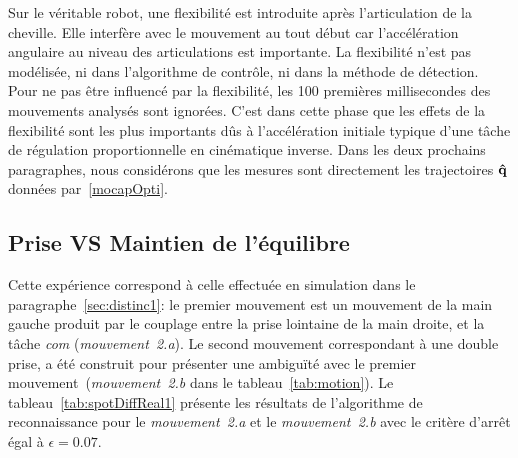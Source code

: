 Sur le véritable robot, une flexibilité est introduite après l'articulation de la cheville.
Elle interfère avec le mouvement au tout début car l'accélération angulaire
au niveau des articulations est importante. La flexibilité n'est pas modélisée,
ni dans l'algorithme de contr\^ole, ni dans la méthode de détection.
Pour ne pas \^etre influencé par la flexibilité, les 100 premières millisecondes
des mouvements analysés sont ignorées. C'est dans cette phase que les effets de la
flexibilité sont les plus importants dûs à l'accélération initiale typique d'une t\^ache
de régulation proportionnelle en cinématique inverse.
Dans les deux prochains paragraphes, nous considérons que les mesures sont directement
les trajectoires ${\mathbf{\hat{q}}}$ données par~\eqref{mocapOpti}.

\subsection{Prise VS Maintien de l'équilibre}
Cette expérience correspond à celle effectuée en simulation dans le paragraphe~\ref{sec:distinc1}:
le premier mouvement est un mouvement de la main gauche produit par le couplage entre
la prise lointaine de la main droite, et la t\^ache \emph{com} (\emph{mouvement~2.a}). 
Le second mouvement correspondant à une double prise, a été construit pour 
présenter une ambiguïté avec le premier mouvement~(\emph{mouvement~2.b} dans le tableau~\ref{tab:motion}).
Le tableau~\ref{tab:spotDiffReal1} présente les résultats de l'algorithme de reconnaissance
pour le \emph{mouvement~2.a} et le \emph{mouvement~2.b} avec le critère d'arrêt égal à $ \epsilon = 0.07$.
